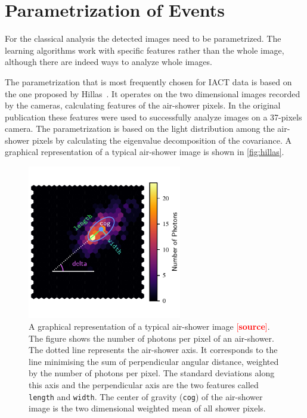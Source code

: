 \section{Parametrization of Events}
\label{sec:params}
%
For the classical analysis the detected images need to be parametrized. The
learning algorithms work with specific features rather than the whole image,
although there are indeed ways to analyze whole images.

The parametrization that is most frequently chosen for IACT data is based on
the one proposed by Hillas~\cite{Hillas}. It operates on the two dimensional
images recorded by the cameras, calculating features of the air-shower pixels.
In the original publication these features were used to successfully analyze
images on a 37-pixels camera. The parametrization is based on the light
distribution among the air-shower pixels by calculating the eigenvalue
decomposition of the covariance. A graphical representation of a typical
air-shower image is shown in \autoref{fig:hillas}.
%
\begin{figure}
  \centering%
  \includegraphics[width=0.6\textwidth]{Plots/hillas.pdf}%
  \caption{A graphical representation of a typical air-shower image \textcolor{red}{[\textbf{source}]}. The figure shows the number of photons per pixel of an air-shower. The dotted
  line represents the air-shower axis. It corresponds to the line minimising the
  sum of perpendicular angular distance, weighted by the number of photons per
  pixel. The standard deviations along this axis and the perpendicular axis are
  the two features called \texttt{length} and \texttt{width}. The center of
  gravity (\texttt{cog}) of the air-shower image is the two dimensional weighted
  mean of all shower pixels.}%
  \label{fig:hillas}%
\end{figure}
